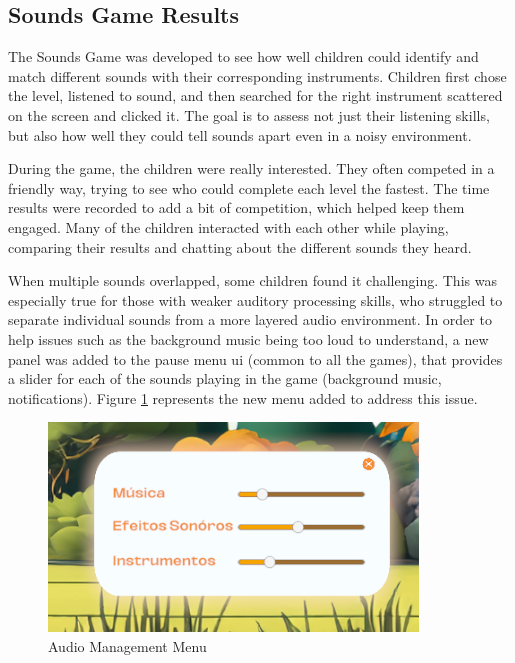 % 


\subsection{Sounds Game Results}

The Sounds Game was developed to see how well children could identify and match different sounds with their corresponding instruments. Children first chose the level, listened to sound, and then searched for the right instrument scattered on the screen and clicked it. The goal is to assess not just their listening skills, but also how well they could tell sounds apart even in a noisy environment.

During the game, the children were really interested. They often competed in a friendly way, trying to see who could complete each level the fastest. The time results were recorded to add a bit of competition, which helped keep them engaged. Many of the children interacted with each other while playing, comparing their results and chatting about the different sounds they heard.

 When multiple sounds overlapped, some children found it challenging. This was especially true for those with weaker auditory processing skills, who struggled to separate individual sounds from a more layered audio environment. In order to help issues such as the background music being too loud to understand, a new panel was added to the pause menu \gls{ui} (common to all the games), that provides a slider for each of the sounds playing in the game (background music, notifications). Figure \ref{fig:sliderMenu} represents the new menu added to address this issue.

 \begin{figure}[!h]
    \centering
    \includegraphics[width=0.5\linewidth]{Chapters/game_changes/sliders.png}
    \caption{Audio Management Menu}
    \label{fig:sliderMenu}
\end{figure}

